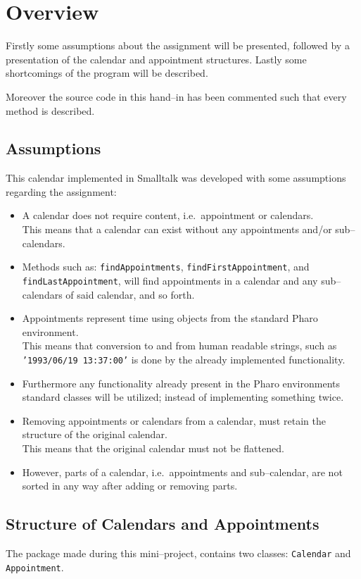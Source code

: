 \chapter{Overview}
Firstly some assumptions about the assignment will be presented, followed by a presentation of the calendar and appointment structures.
Lastly some shortcomings of the program will be described.

Moreover the source code in this hand--in has been commented such that every method is described.

\section{Assumptions}
This calendar implemented in Smalltalk was developed with some assumptions regarding the assignment:
\begin{itemize}
    \item A calendar does not require content, i.e.~appointment or calendars.\\
        This means that a calendar can exist without any appointments and/or sub--calendars.
    \item Methods such as: \texttt{findAppointments}, \texttt{findFirstAppointment}, and\\
        \texttt{findLastAppointment}, will find appointments in a calendar and any sub--calendars of said calendar, and so forth.
    \item Appointments represent time using objects from the standard Pharo environment.\\
        This means that conversion to and from human readable strings, such as \texttt{'1993/06/19 13:37:00'} is done by the already implemented functionality.
    \item Furthermore any functionality already present in the Pharo environments standard classes will be utilized;
        instead of implementing something twice.
    \item Removing appointments or calendars from a calendar, must retain the structure of the original calendar.\\
        This means that the original calendar must not be flattened.
    \item However, parts of a calendar, i.e.~appointments and sub--calendar, are not sorted in any way after adding or removing parts.
\end{itemize}

\section{Structure of Calendars and Appointments}
The package made during this mini--project, contains two classes: \texttt{Calendar} and \texttt{Appointment}.

